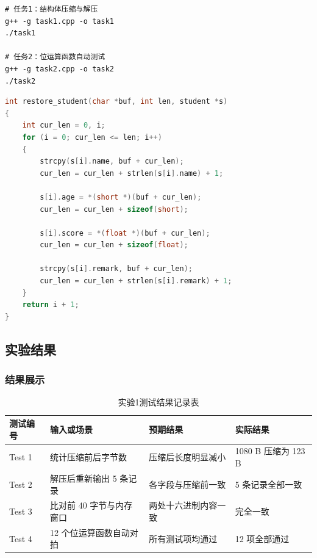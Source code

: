 \documentclass[supercite]{Experimental_Report}
\theoremstyle{definition}
\begin{document}
\begin{lstlisting}[language=Shell, caption={实验1中使用的编译与运行命令}, label={lst:lab1-shell}]
# 任务1：结构体压缩与解压
g++ -g task1.cpp -o task1
./task1

# 任务2：位运算函数自动测试
g++ -g task2.cpp -o task2
./task2
\end{lstlisting}

\begin{lstlisting}[language=C, caption={任务1解压核心代码}, label={lst:restore-code}]
int restore_student(char *buf, int len, student *s)
{
    int cur_len = 0, i;
    for (i = 0; cur_len <= len; i++)
    {
        strcpy(s[i].name, buf + cur_len);
        cur_len = cur_len + strlen(s[i].name) + 1;

        s[i].age = *(short *)(buf + cur_len);
        cur_len = cur_len + sizeof(short);

        s[i].score = *(float *)(buf + cur_len);
        cur_len = cur_len + sizeof(float);

        strcpy(s[i].remark, buf + cur_len);
        cur_len = cur_len + strlen(s[i].remark) + 1;
    }
    return i + 1;
}
\end{lstlisting}

\subsection{实验结果}

\subsubsection{结果展示}
\begin{table}[H]
  \centering
  \caption{实验1测试结果记录表}
  \label{tbl:lab1-test-result}
  \begin{tabular}{p{}p{}p{}p{}}
    \toprule
    测试编号 & 输入或场景 & 预期结果 & 实际结果 \\
    \midrule
    Test 1 & 统计压缩前后字节数 & 压缩后长度明显减小 & 1080 B 压缩为 123 B \\
    Test 2 & 解压后重新输出 5 条记录 & 各字段与压缩前一致 & 5 条记录全部一致 \\
    Test 3 & 比对前 40 字节与内存窗口 & 两处十六进制内容一致 & 完全一致 \\
    Test 4 & 12 个位运算函数自动对拍 & 所有测试项均通过 & 12 项全部通过 \\
    \bottomrule
  \end{tabular}
\end{table}
\end{document}
